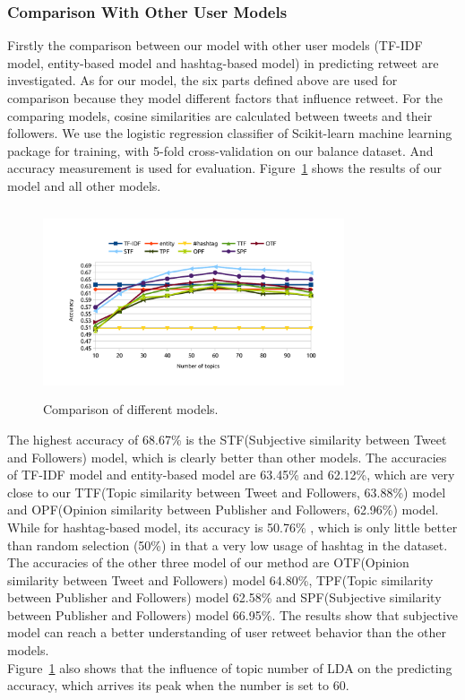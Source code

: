\documentclass{acm_proc_article-sp}
\begin{document}
\subsubsection{Comparison With Other User Models}
\label{comparison}
Firstly the comparison between our model with other user models (TF-IDF model\cite{Luo:2013RMF}, entity-based model and hashtag-based model\cite{Abel:2011AUM}) in predicting retweet are investigated.
As for our model, the six parts defined above are used for comparison because they model different factors that influence retweet.
For the comparing models, cosine similarities are calculated between tweets and their followers.
We use the logistic regression classifier of Scikit-learn machine learning package\cite{scikit-learn} for training, with 5-fold cross-validation on our balance dataset.
And accuracy measurement is used for evaluation.
Figure~\ref{fig:graph7} shows the results of our model and all other models.
\begin{figure}[htb]
\centering
\includegraphics[width=3.5in,height=2.2in]{comparison.pdf}
\caption{Comparison of different models.}
\label{fig:graph7}
\end{figure}
The highest accuracy of 68.67\% is the STF(Subjective similarity between Tweet and Followers) model, which is clearly better than other models. 
The accuracies of TF-IDF model and entity-based model are 63.45\% and 62.12\%, which are very close to our TTF(Topic similarity between Tweet and Followers, 63.88\%) model and OPF(Opinion similarity between Publisher and Followers, 62.96\%) model.
While for hashtag-based model, its accuracy is  50.76\% , which is only little better than random selection (50\%) in that a very low usage of hashtag in the dataset.
The accuracies of the other three model of our method are OTF(Opinion similarity between Tweet and Followers) model 64.80\%, TPF(Topic similarity between Publisher and Followers) model 62.58\% and SPF(Subjective similarity between Publisher and Followers) model 66.95\%.
The results show that subjective model can reach a better understanding of user retweet behavior than the other models.\\
Figure~\ref{fig:graph7} also shows that the influence of topic number of LDA on the predicting accuracy, which arrives its peak when the number is set to 60.
\end{document}

